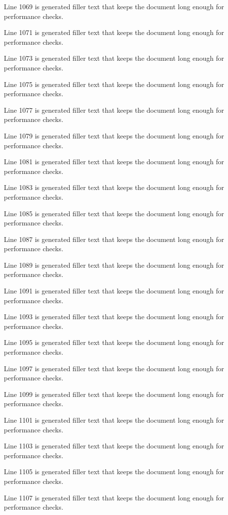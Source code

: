 Line 1069 is generated filler text that keeps the document long enough for performance checks.

Line 1071 is generated filler text that keeps the document long enough for performance checks.

Line 1073 is generated filler text that keeps the document long enough for performance checks.

Line 1075 is generated filler text that keeps the document long enough for performance checks.

Line 1077 is generated filler text that keeps the document long enough for performance checks.

Line 1079 is generated filler text that keeps the document long enough for performance checks.

Line 1081 is generated filler text that keeps the document long enough for performance checks.

Line 1083 is generated filler text that keeps the document long enough for performance checks.

Line 1085 is generated filler text that keeps the document long enough for performance checks.

Line 1087 is generated filler text that keeps the document long enough for performance checks.

Line 1089 is generated filler text that keeps the document long enough for performance checks.

Line 1091 is generated filler text that keeps the document long enough for performance checks.

Line 1093 is generated filler text that keeps the document long enough for performance checks.

Line 1095 is generated filler text that keeps the document long enough for performance checks.

Line 1097 is generated filler text that keeps the document long enough for performance checks.

Line 1099 is generated filler text that keeps the document long enough for performance checks.

Line 1101 is generated filler text that keeps the document long enough for performance checks.

Line 1103 is generated filler text that keeps the document long enough for performance checks.

Line 1105 is generated filler text that keeps the document long enough for performance checks.

Line 1107 is generated filler text that keeps the document long enough for performance checks.

